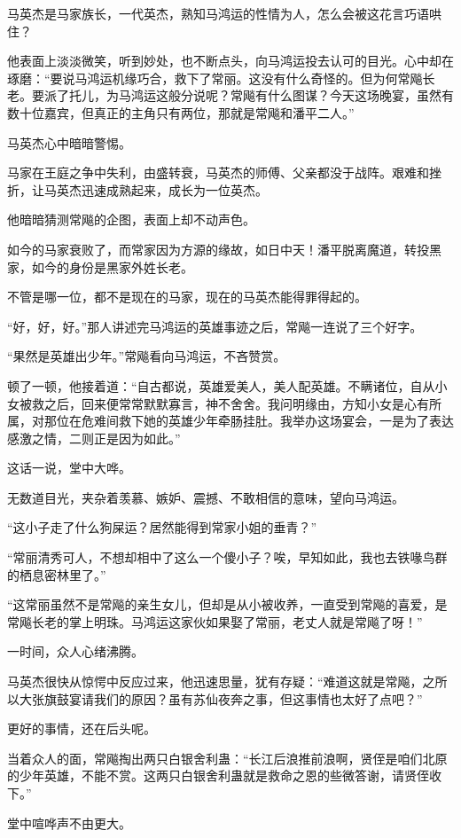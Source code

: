 \begin{this_body}
马英杰是马家族长，一代英杰，熟知马鸿运的性情为人，怎么会被这花言巧语哄住？

他表面上淡淡微笑，听到妙处，也不断点头，向马鸿运投去认可的目光。心中却在琢磨：“要说马鸿运机缘巧合，救下了常丽。这没有什么奇怪的。但为何常飚长老。要派了托儿，为马鸿运这般分说呢？常飚有什么图谋？今天这场晚宴，虽然有数十位嘉宾，但真正的主角只有两位，那就是常飚和潘平二人。”

马英杰心中暗暗警惕。

马家在王庭之争中失利，由盛转衰，马英杰的师傅、父亲都没于战阵。艰难和挫折，让马英杰迅速成熟起来，成长为一位英杰。

他暗暗猜测常飚的企图，表面上却不动声色。

如今的马家衰败了，而常家因为方源的缘故，如日中天！潘平脱离魔道，转投黑家，如今的身份是黑家外姓长老。

不管是哪一位，都不是现在的马家，现在的马英杰能得罪得起的。

“好，好，好。”那人讲述完马鸿运的英雄事迹之后，常飚一连说了三个好字。

“果然是英雄出少年。”常飚看向马鸿运，不吝赞赏。

顿了一顿，他接着道：“自古都说，英雄爱美人，美人配英雄。不瞒诸位，自从小女被救之后，回来便常常默默寡言，神不舍舍。我问明缘由，方知小女是心有所属，对那位在危难间救下她的英雄少年牵肠挂肚。我举办这场宴会，一是为了表达感激之情，二则正是因为如此。”

这话一说，堂中大哗。

无数道目光，夹杂着羡慕、嫉妒、震撼、不敢相信的意味，望向马鸿运。

“这小子走了什么狗屎运？居然能得到常家小姐的垂青？”

“常丽清秀可人，不想却相中了这么一个傻小子？唉，早知如此，我也去铁喙鸟群的栖息密林里了。”

“这常丽虽然不是常飚的亲生女儿，但却是从小被收养，一直受到常飚的喜爱，是常飚长老的掌上明珠。马鸿运这家伙如果娶了常丽，老丈人就是常飚了呀！”

一时间，众人心绪沸腾。

马英杰很快从惊愕中反应过来，他迅速思量，犹有存疑：“难道这就是常飚，之所以大张旗鼓宴请我们的原因？虽有苏仙夜奔之事，但这事情也太好了点吧？”

更好的事情，还在后头呢。

当着众人的面，常飚掏出两只白银舍利蛊：“长江后浪推前浪啊，贤侄是咱们北原的少年英雄，不能不赏。这两只白银舍利蛊就是救命之恩的些微答谢，请贤侄收下。”

堂中喧哗声不由更大。


\end{this_body}
